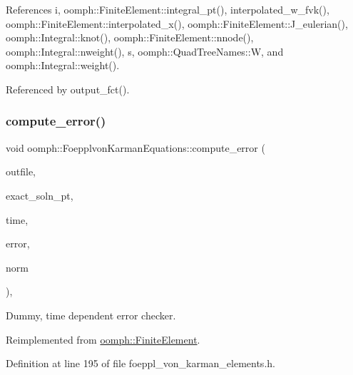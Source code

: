 References i, oomph\+::\+Finite\+Element\+::integral\+\_\+pt(), interpolated\+\_\+w\+\_\+fvk(), oomph\+::\+Finite\+Element\+::interpolated\+\_\+x(), oomph\+::\+Finite\+Element\+::\+J\+\_\+eulerian(), oomph\+::\+Integral\+::knot(), oomph\+::\+Finite\+Element\+::nnode(), oomph\+::\+Integral\+::nweight(), s, oomph\+::\+Quad\+Tree\+Names\+::W, and oomph\+::\+Integral\+::weight().



Referenced by output\+\_\+fct().

\mbox{\label{classoomph_1_1FoepplvonKarmanEquations_ac5ba601294d66e0d1e7506cb836e7f59}} 
\subsubsection{\texorpdfstring{compute\+\_\+error()}{compute\_error()}\hspace{0.1cm}{\footnotesize\ttfamily [2/2]}}
{\footnotesize\ttfamily void oomph\+::\+Foepplvon\+Karman\+Equations\+::compute\+\_\+error (\begin{DoxyParamCaption}\item[{std\+::ostream \&}]{outfile,  }\item[{\hyperlink{classoomph_1_1FiniteElement_ad4ecf2b61b158a4b4d351a60d23c633e}{Finite\+Element\+::\+Unsteady\+Exact\+Solution\+Fct\+Pt}}]{exact\+\_\+soln\+\_\+pt,  }\item[{const double \&}]{time,  }\item[{double \&}]{error,  }\item[{double \&}]{norm }\end{DoxyParamCaption})\hspace{0.3cm}{\ttfamily [inline]}, {\ttfamily [virtual]}}



Dummy, time dependent error checker. 



Reimplemented from \hyperlink{classoomph_1_1FiniteElement_a7f67853506dc73fa6b7505108de22d1f}{oomph\+::\+Finite\+Element}.



Definition at line 195 of file foeppl\+\_\+von\+\_\+karman\+\_\+elements.\+h.

